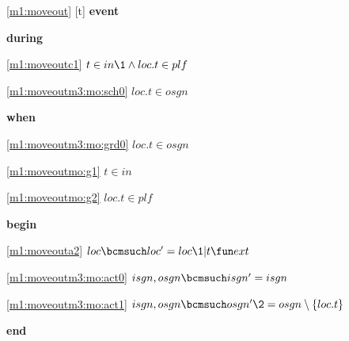 \noindent \ref{m1:moveout} [t] \textbf{event}
\begin{block}
  \item   \textbf{during}
  \begin{block}
  \item[ \eqref{m1:moveoutc1} ]$t \in in  %
  		\1\land loc.t \in plf $ %
  \item[ \eqref{m1:moveoutm3:mo:sch0} ]$loc.t \in osgn $ %
  \end{block}
  \item   \textbf{when}
  \begin{block}
  \item[ \eqref{m1:moveoutm3:mo:grd0} ]$loc.t \in osgn $ %
  \item[ \eqref{m1:moveoutmo:g1} ]$t \in in $ %
  \item[ \eqref{m1:moveoutmo:g2} ]$loc.t \in plf $ %
  \end{block}
  \item   \textbf{begin}
  \begin{block}
  \item[ \eqref{m1:moveouta2} ]$loc \bcmsuch loc' = loc \1 | t \fun ext $ %
  \item[ \eqref{m1:moveoutm3:mo:act0} ]$isgn,osgn \bcmsuch isgn' = isgn$ %
  \item[ \eqref{m1:moveoutm3:mo:act1} ]$isgn,osgn \bcmsuch osgn'  \2 = osgn  %
  	\setminus \{ loc.t \} $ %
  \end{block}
  \item   \textbf{end} \\
\end{block}
